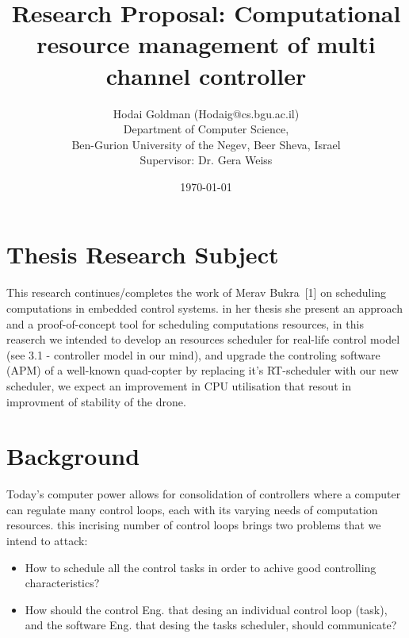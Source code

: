 \documentclass[11pt]{article}
\author{Hodai Goldman (Hodaig@cs.bgu.ac.il) \\
Department of Computer Science, \\
Ben-Gurion University of the Negev, Beer Sheva, Israel \\
Supervisor: Dr. Gera Weiss}
\date{\today}
\title{Research Proposal: Computational resource management of multi channel controller}
\begin{document}
\begin{titlepage}
\maketitle
\end{titlepage}




\section{Thesis Research Subject}
This research continues/completes the work of Merav Bukra~[1] on scheduling computations in embedded control systems.
in her thesis she present an approach and a proof-of-concept tool for scheduling computations resources,
in this reaserch we intended to develop an resources scheduler for real-life control model (see 3.1 - controller model in our mind),
and upgrade the controling software (APM) of a well-known quad-copter by replacing it's RT-scheduler with our new scheduler,
we expect an improvement in CPU utilisation that resout in improvment of stability of the drone.


\section{Background}
Today’s computer power allows for consolidation of controllers where a computer can regulate many control loops,
each with its varying needs of computation resources.
this incrising number of control loops brings two problems that we intend to attack:
\begin{itemize}
\item How to schedule all the control tasks in order to achive good controlling characteristics?
\item How should the control Eng. that desing an individual control loop (task), and the software Eng. that desing the tasks scheduler, should communicate?
\end{itemize}
\end{document}
